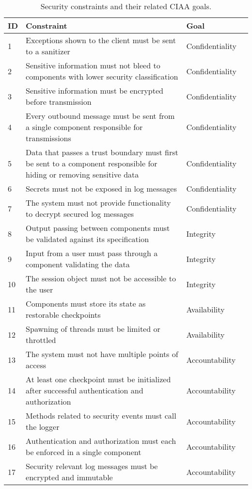 \begin{table}
\begin{center}
\begin{tabular}{lp{10.4cm}ll}
\hline
\textbf{ID} & \textbf{Constraint} & \textbf{Goal} \\
\hline
1  & Exceptions shown to the client must be sent to a sanitizer  & Confidentiality \\
\rowcolor{RowColor}
2  & Sensitive information must not bleed to components with lower security classification  & Confidentiality \\
3  & Sensitive information must be encrypted before transmission  & Confidentiality \\
\rowcolor{RowColor}
4  & Every outbound message must be sent from a single component responsible for transmissions  & Confidentiality \\
5  & Data that passes a trust boundary must first be sent to a component responsible for hiding or removing sensitive data  & Confidentiality \\
\rowcolor{RowColor}
6  & Secrets must not be exposed in log messages  & Confidentiality \\
7  & The system must not provide functionality to decrypt secured log messages  & Confidentiality \\
\rowcolor{RowColor}
8  & Output passing between components must be validated against its specification & Integrity \\
9  & Input from a user must pass through a component validating the data  & Integrity \\
\rowcolor{RowColor}
10 & The session object must not be accessible to the user  & Integrity \\
11 & Components must store its state as restorable checkpoints  & Availability \\
\rowcolor{RowColor}
12 & Spawning of threads must be limited or throttled  & Availability \\
13 & The system must not have multiple points of access  & Accountability \\
\rowcolor{RowColor}
14 & At least one checkpoint must be initialized after successful authentication and authorization  & Accountability \\
15 & Methods related to security events must call the logger  & Accountability \\
\rowcolor{RowColor}
16 & Authentication and authorization must each be enforced in a single component  & Accountability \\
17 & Security relevant log messages must be encrypted and immutable & Accountability \\
\hline
\end{tabular}
\end{center}
\caption{Security constraints and their related CIAA goals.}
\label{tab:all_measures}
\end{table}

